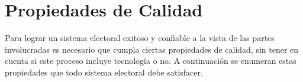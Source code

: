\section{Propiedades de Calidad}
\label{propiedadesCalidad}
Para lograr un sistema electoral exitoso y confiable a la vista de las partes involucradas es necesario que cumpla ciertas propiedades de calidad, sin tener en cuenta si este proceso incluye tecnología o no. A continuación se enumeran estas propiedades que todo sistema electoral debe satisfacer.
